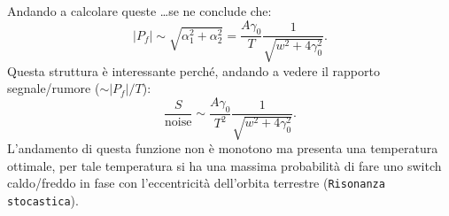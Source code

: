 Andando a calcolare queste \ldots se ne conclude che:
\[
    \left|P_f\right| \sim \sqrt{\alpha_1^2+\alpha_2^2} = \frac{A\gamma_0}{T}\frac{1}{\sqrt{ w^2 + 4\gamma_0^2} }
.\] 
Questa struttura è interessante perché, andando a vedere il rapporto segnale/rumore ($\sim \left|P_f\right| / T$):
\[
    \frac{S}{\text{noise}} \sim \frac{A\gamma_0}{T^2 }\frac{1}{\sqrt{ w^2 + 4\gamma_0^2} }
.\] 
L'andamento di questa funzione non è monotono ma presenta una temperatura ottimale, per tale temperatura si ha una massima probabilità di fare uno switch caldo/freddo in fase con l'eccentricità dell'orbita terrestre (\texttt{Risonanza stocastica}).
\clearpage
